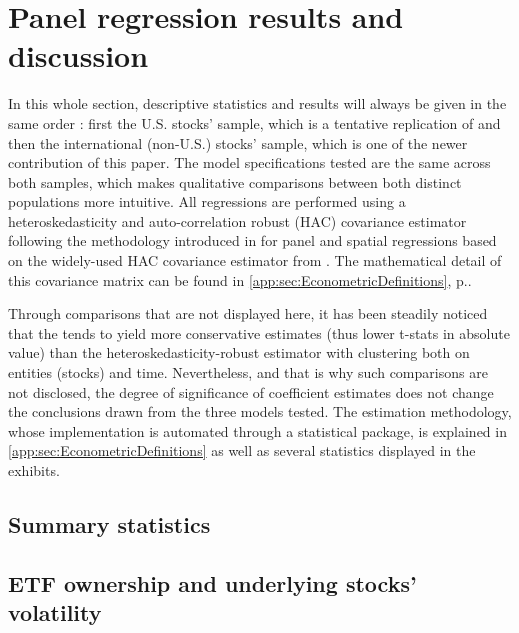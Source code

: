 \section{Panel regression results and discussion}
\label{sec:Results}
In this whole section, descriptive statistics and results will always be given in the same order : first the U.S. stocks' sample, which is a tentative replication of \textcite{Ben-David2018} and then the international (non-U.S.) stocks' sample, which is one of the newer contribution of this paper. The model specifications tested are the same across both samples, which makes qualitative comparisons between both distinct populations more intuitive. All regressions are performed using a heteroskedasticity and auto-correlation robust (HAC) covariance estimator following the methodology introduced in \textcite{Driscoll1998} for panel and spatial regressions based on the widely-used HAC covariance estimator from \textcite{Newey1987}. The mathematical detail of this covariance matrix can be found in \autoref{app:sec:EconometricDefinitions}, p.\pageref{app:sec:EconometricDefinitions}.

Through comparisons that are not displayed here, it has been steadily noticed that the \textcite{Newey1987} tends to yield more conservative estimates (thus lower t-stats in absolute value) than the heteroskedasticity-robust estimator with clustering both on entities (stocks) and time. Nevertheless, and that is why such comparisons are not disclosed, the degree of significance of coefficient estimates does not change the conclusions drawn from the three models tested.  The estimation methodology, whose implementation is automated through a statistical package, is explained in \autoref{app:sec:EconometricDefinitions} as well as several statistics displayed in the exhibits.

\subsection{Summary statistics}


\subsection{ETF ownership and underlying stocks' volatility}
\label{sec:Results:sub:Volatility}
